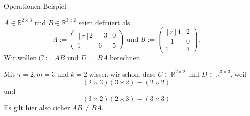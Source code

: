 \documentclass[
  8pt,
  ignorenonframetext,
]{beamer}
\begin{document}
\begin{frame}{Operationen}
\protect\hypertarget{operationen-15}{}
Beispiel

\small
\justifying

\(A\in \mathbb{R}^{2\times 3}\) und \(B\in \mathbb{R}^{3\times 2}\)
seien definiert als \begin{equation}
A := \begin{pmatrix*}[r]
2 & -3 &  0   \\
1 &  6 &  5
\end{pmatrix*}
\mbox{ und }
B := \begin{pmatrix*}[r]
 4 & 2  \\
-1 & 0  \\
 1 & 3
\end{pmatrix*}.
\end{equation} Wir wollen \(C := AB\) und \(D := BA\) berechnen.

Mit \(n = 2, m = 3\) und \(k = 2\) wissen wir schon, dass
\(C \in \mathbb{R}^{2 \times 2}\) und \(D \in \mathbb{R}^{3 \times 3}\),
weil \begin{equation}
(2 \times 3)(3 \times 2) = (2 \times 2)
\end{equation} und \begin{equation}
(3 \times 2)(2 \times 3) = (3 \times 3)
\end{equation} Es gilt hier also sicher \(AB \neq BA\).
\end{frame}
\end{document}
